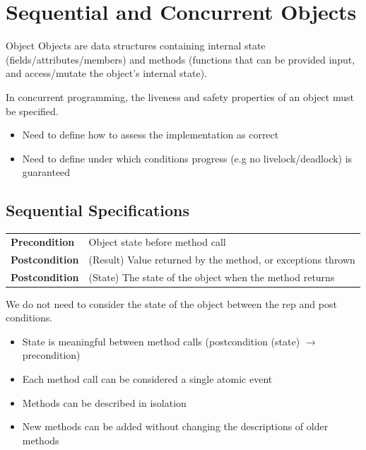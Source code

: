 \unfinished

\section{Sequential and Concurrent Objects}
\begin{definitionbox}{Object}
    Objects are data structures containing internal state (fields/attributes/members) and methods (functions that can be provided input, and access/mutate the object's internal state).
\end{definitionbox}
In concurrent programming, the liveness and safety properties of an object must be specified.
\begin{itemize}
    \item Need to define how to assess the implementation as correct
    \item Need to define under which conditions progress (e.g no livelock/deadlock) is guaranteed
\end{itemize}

\subsection{Sequential Specifications}
\begin{center}
    \begin{tabular}{l p{}}
        \textbf{Precondition} & Object state before method call \\
        \textbf{Postcondition} & (Result) Value returned by the method, or exceptions thrown \\
        \textbf{Postcondition} & (State)  The state of the object when the method returns \\
    \end{tabular}
\end{center}
We do not need to consider the state of the object between the rep and post conditions.
\begin{itemize}
    \item State is meaningful between method calls (postcondition (state) $\to$ precondition)
    \item Each method call can be considered a single atomic event
    \item Methods can be described in isolation
    \item New methods can be added without changing the descriptions of older methods
\end{itemize}

